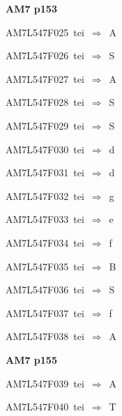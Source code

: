\par\vfill\eject
{\bf\hfill AM7 p153\hfill\hbox{}}\par\bigskip
{\sixrm AM7L547F025\ {\sixit tei}\ }$\Rightarrow$\ A\par\smallskip
{\sixrm AM7L547F026\ {\sixit tei}\ }$\Rightarrow$\ S\par\smallskip
{\sixrm AM7L547F027\ {\sixit tei}\ }$\Rightarrow$\ A\par\smallskip
{\sixrm AM7L547F028\ {\sixit tei}\ }$\Rightarrow$\ S\par\smallskip
{\sixrm AM7L547F029\ {\sixit tei}\ }$\Rightarrow$\ S\par\smallskip
{\sixrm AM7L547F030\ {\sixit tei}\ }$\Rightarrow$\ {\tenit d}\par\smallskip
{\sixrm AM7L547F031\ {\sixit tei}\ }$\Rightarrow$\ {\tenit d}\par\smallskip
{\sixrm AM7L547F032\ {\sixit tei}\ }$\Rightarrow$\ {\tenit g}\par\smallskip
{\sixrm AM7L547F033\ {\sixit tei}\ }$\Rightarrow$\ {\tenit e}\par\smallskip
{\sixrm AM7L547F034\ {\sixit tei}\ }$\Rightarrow$\ {\tenit f}\par\smallskip
{\sixrm AM7L547F035\ {\sixit tei}\ }$\Rightarrow$\ B\par\smallskip
{\sixrm AM7L547F036\ {\sixit tei}\ }$\Rightarrow$\ S\par\smallskip
{\sixrm AM7L547F037\ {\sixit tei}\ }$\Rightarrow$\ {\tenit f}\par\smallskip
{\sixrm AM7L547F038\ {\sixit tei}\ }$\Rightarrow$\ A\par\smallskip

\par\vfill\eject
{\bf\hfill AM7 p155\hfill\hbox{}}\par\bigskip
{\sixrm AM7L547F039\ {\sixit tei}\ }$\Rightarrow$\ A\par\smallskip
{\sixrm AM7L547F040\ {\sixit tei}\ }$\Rightarrow$\ T\par\smallskip

